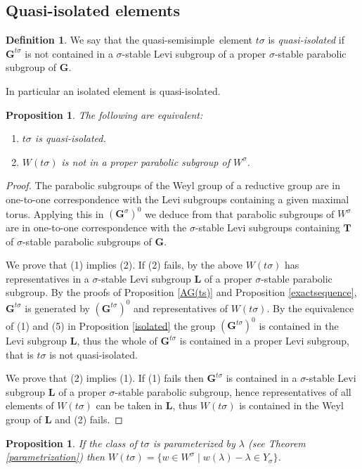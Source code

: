\documentclass{amsart}
\newtheorem{proposition}[equation]{Proposition}
\numberwithin{equation}{section}
\theoremstyle{definition}
\newtheorem{definition}[equation]{Definition}
\theoremstyle{remark}
\newcommand\bG{{\mathbf G}}
\newcommand\bL{{\mathbf L}}
\newcommand\bT{{\mathbf T}}
\newcommand\Gtso{{(\bG^{t\sigma})^0}}
\newcommand\Gts{{\bG^{t\sigma}}}
\newcommand\Gs{{\bG^\sigma}}
\newcommand\Gso{{(\Gs)^0}}
\newcommand\qss{quasi-semisimple}
\begin{document}
\subsection*{Quasi-isolated elements}
\begin{definition}
We say that the \qss\ element $t\sigma$ is {\em quasi-isolated}
if $\Gts$ is not contained in a $\sigma$-stable Levi subgroup of 
a proper $\sigma$-stable parabolic subgroup of $\bG$.
\end{definition}
In particular an isolated element is quasi-isolated.
\begin{proposition}\label{quasi-isolated} The following are equivalent:
\begin{enumerate}
\item $t\sigma$ is quasi-isolated.
\item $W(t\sigma)$ is not in a proper parabolic subgroup of $W^\sigma$.
\end{enumerate}
\end{proposition}
\begin{proof}
The parabolic subgroups of the Weyl group of a
reductive group are in one-to-one correspondence with the Levi subgroups
containing a given maximal torus. Applying this in $\Gso$ we deduce from
\cite[1.25(ii)]{grnc} that parabolic subgroups of $W^\sigma$ are in
one-to-one correspondence with the $\sigma$-stable Levi subgroups
containing $\bT$ of $\sigma$-stable parabolic subgroups of $\bG$.

We prove that (1) implies (2). If (2) fails,
by the above $W(t\sigma)$
has representatives in a $\sigma$-stable Levi
subgroup $\bL$ of a proper $\sigma$-stable parabolic subgroup.
By the proofs of Proposition \ref{AG(ts)} and Proposition \ref{exactsequence},
$\Gts$ is generated by $\Gtso$ and representatives of
$W(t\sigma)$. By the equivalence of (1) and (5) in Proposition \ref{isolated}
the group $\Gtso$ is
contained in the Levi subgroup $\bL$, 
thus the whole of $\Gts$ is contained
in a proper Levi subgroup, that is $t\sigma$ is not quasi-isolated.

We prove that (2) implies (1). If (1) fails then $\Gts$ is
contained in a $\sigma$-stable Levi subgroup $\bL$ of a proper
$\sigma$-stable parabolic subgroup, hence representatives of all elements of
$W(t\sigma)$ can be taken in $\bL$, thus $W(t\sigma)$ is contained in the
Weyl group of $\bL$ and (2) fails.
\end{proof}
\begin{proposition}\label{W(t sigma)}
If the class of $t\sigma$ is parameterized by $\lambda$ (see Theorem
\ref{parametrization})
then $W(t\sigma)=\{w\in W^\sigma\mid w(\lambda)-\lambda\in Y_\sigma\}$.
\end{proposition}
\end{document}
